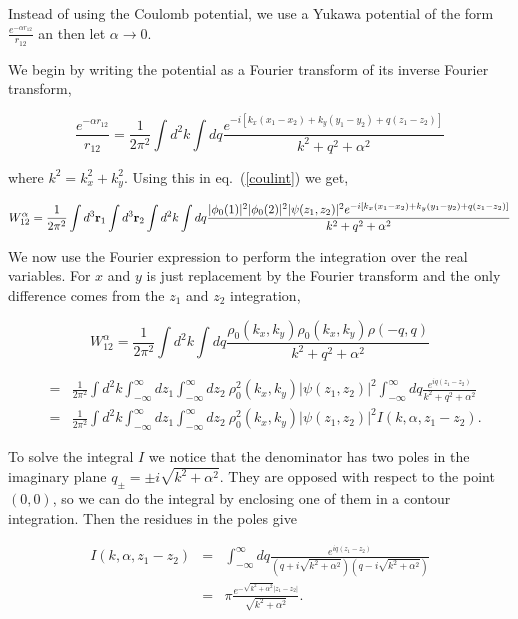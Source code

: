 \documentclass[a4paper,10pt]{article}
\begin{document}
Instead of using the Coulomb potential, we use a Yukawa potential of the form
$\frac{e^{-\alpha r_{12}}}{r_{12}}$ an then let $\alpha \rightarrow 0$.

We begin by writing the potential as a Fourier transform of its inverse Fourier transform,

\begin{equation}
\frac{e^{-\alpha r_{12}}}{r_{12}} = \frac{1}{2\pi^2} \int d^2k \int dq \frac{e^{-i\left[k_x(x_1-x_2) + k_y(y_1-y_2) + q (z_1-z_2)\right]}}{k^2 + q^2 + \alpha^2}
\end{equation}

\noindent where $k^{2}=k^{2}_{x} + k^{2}_{y}$. Using this in eq.~(\ref{coulint}) we get,

\begin{equation}
W^{\alpha}_{12}= \frac{1}{2\pi^2}\int d^3\mathbf{r}_1 \int d^3\mathbf{r}_2 \int d^2k \int dq \frac{
|\phi_0(1)|^2|\phi_0(2)|^2|\psi(z_1,z_2)|^2 e^{-i\left[k_x(x_1-x_2) +
k_y(y_1-y_2) + q (z_1-z_2)\right]}}{k^2 + q^2 + \alpha^2}
\end{equation}

We now use the Fourier expression to perform the integration over the real variables. For
$x$ and $y$ is just replacement by the Fourier transform and the
only difference comes from the $z_1$ and $z_2$ integration,

\begin{equation}
W^{\alpha}_{12}= \frac{1}{2\pi^2}\int d^2k \int dq
\frac{\rho_0(k_x,k_y)\rho_0(k_x,k_y)\rho(-q,q) }{k^2 + q^2 + \alpha^2}
\end{equation}

\begin{eqnarray}
&=& \frac{1}{2\pi^2}\int d^2k \int^\infty_{-\infty} dz_1 \int^\infty_{-\infty} dz_2
\ \rho^2_0(k_x,k_y)|\psi(z_1,z_2)|^2 \int^\infty_{-\infty} dq
\frac{e^{iq(z_1-z_2)}}{k^2 + q^2 + \alpha^2} \nonumber\\
&=& \frac{1}{2\pi^2}\int d^2k \int^\infty_{-\infty} dz_1 \int^\infty_{-\infty} dz_2
\ \rho^2_0(k_x,k_y)|\psi(z_1,z_2)|^2 I(k,\alpha , z_1-z_2).\label{coulint2}
\end{eqnarray}

To solve the integral $I$ we notice that the denominator has two poles in the imaginary
plane $q_{\pm}=\pm i \sqrt{k^2+\alpha^2}$. They are opposed with respect to the point
$(0,0)$, so we can do the integral by enclosing one of them in a contour integration.
Then the residues in the poles give

\begin{eqnarray}
I(k,\alpha,z_1-z_2) &=& \int^\infty_{-\infty} dq \frac{e^{iq(z_1-z_2)}}{(q+i\sqrt{k^2+\alpha^2})(q-i\sqrt{k^2+\alpha^2})} \\
&=& \pi \frac{e^{-\sqrt{k^2+\alpha^2}|z_1-z_2|}}{\sqrt{k^2+\alpha^2}}.
\end{eqnarray}
\end{document}
